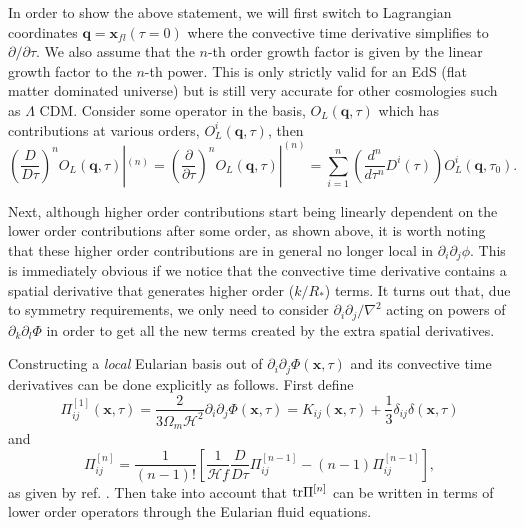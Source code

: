 \documentclass[11pt]{article}
\DeclareRobustCommand{\tr}{\ifmmode\text{tr}\else d\fi}
\newcommand{\br}[1]{\ensuremath{\left( #1 \right)}}
\newcommand{\sbr}[1]{\ensuremath{\left[ #1 \right]}}
\begin{document}
In order to show the above statement, we will first switch to Lagrangian coordinates $\mathbf q = \mathbf x_{fl}(\tau=0)$ where the convective time derivative simplifies to $\partial/\partial \tau$. We also assume that the $n$-th order growth factor is given by the linear growth factor to the $n$-th power. This is only strictly valid for an EdS (flat matter dominated universe) but is still very accurate for other cosmologies such as $\Lambda$ CDM. %
Consider some operator in the basis, $O_L(\mathbf q, \tau)$ which has contributions at various orders, $O_L^i(\mathbf q, \tau)$, then
\begin{equation}
    \br{\frac{D}{D\tau}}^n O_L(\mathbf q, \tau)|^{(n)} = \br{\frac{\partial}{\partial\tau}}^n O_L(\mathbf q, \tau)|^{(n)} = \sum_{i = 1}^n \br{\frac{d^n}{d\tau^n}D^i(\tau)}O^{i}_{L}(\mathbf q, \tau_0).
\end{equation}

Next, although higher order contributions start being linearly dependent on the lower order contributions after some order, as shown above, it is worth noting that these higher order contributions are in general no longer local in $\partial_i\partial_j \phi$. This is immediately obvious if we notice that the convective time derivative contains a spatial derivative that generates higher order ($k/R_*$) terms. It turns out that, due to symmetry requirements, we only need to consider $\partial_i \partial_j / \nabla ^2$ acting on powers of $\partial_k \partial_l \Phi$ in order to get all the new terms created by the extra spatial derivatives. %

Constructing a \emph{local} Eularian basis out of $\partial_i\partial_j\Phi(\mathbf x, \tau)$ and its convective time derivatives can be done explicitly as follows. First define
\begin{equation}
    \Pi^{[1]}_{ij}(\mathbf x, \tau) = \frac{2}{3\Omega_m\mathcal H^2}\partial_i\partial_j\Phi(\mathbf x, \tau) = K_{ij}(\mathbf x, \tau) + \frac{1}{3}\delta_{ij}\delta(\mathbf x, \tau)
\end{equation}
and
\begin{equation}
    \Pi^{[n]}_{ij} = \frac{1}{(n-1)!}\sbr{ \frac{1}{\mathcal H f}\frac{D}{D\tau} \Pi^{[n-1]}_{ij} - (n-1)\Pi^{[n-1]}_{ij}},
\end{equation}
as given by ref. \cite{Mirbabayi_2015}. Then take into account that $\tr \Pi^{[n]}$ can be written in terms of lower order operators through the Eularian fluid equations. %
\end{document}
